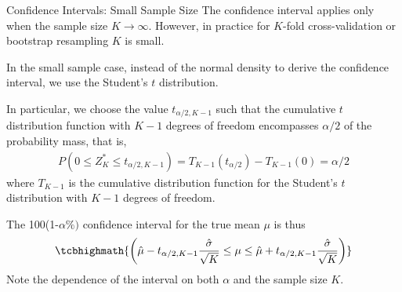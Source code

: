 \begin{frame}{Confidence Intervals: Small Sample Size}
The conf\/{i}dence interval
applies only when the sample
size $K\to \infty$. However, in practice for $K$-fold cross-validation
or bootstrap resampling $K$ is small.

\medskip
In the small sample case, instead of the
normal density to derive the conf\/{i}dence interval, we use the
Student's $t$
distribution. 


\medskip
In particular, we choose the value
$t_{\alpha/2,K-1}$ such that the cumulative $t$ distribution
function with $K-1$ degrees of freedom encompasses $\alpha/2$ of
the probability mass, that is,
\begin{align*}
  P(0 \le Z_K^* \le t_{\alpha/2,K-1}) = T_{K-1}(t_{\alpha/2}) - T_{K-1}(0) =
  \alpha/2
\end{align*}
where $T_{K-1}$ is the cumulative distribution function for the
Student's $t$ distribution with $K-1$ degrees of freedom. 

\medskip
The 100(1-$\alpha\%)$ conf\/{i}dence interval for the true mean $\mu$ is thus
$$
\tcbhighmath{
\lB(\hmu - t_{\alpha/2,K-1}{\hsigma \over \sqrt{K}} \le \mu \le
 \hmu + t_{\alpha/2,K-1}{\hsigma \over \sqrt{K}} \rB)
}
$$
Note the dependence of the interval on both $\alpha$ and the sample size
$K$.
\end{frame}





